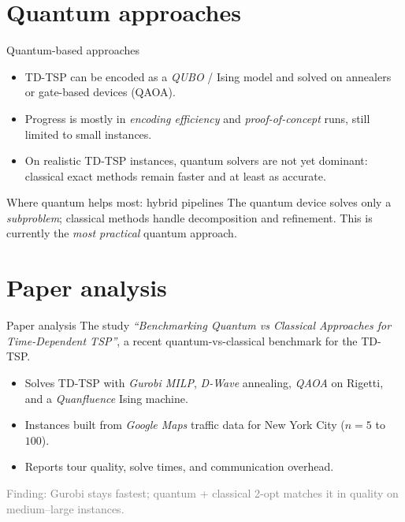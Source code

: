 \documentclass[
11pt,notheorems,hyperref={pdfauthor=Alma Arevalo Loyola}
]{beamer}
\renewcommand{\emphasize}[1]{\textcolor{emphasisblue}{\textit{#1}}}
\newcommand{\emphteal}[1]{\textcolor{emphasisteal}{\textit{#1}}}
\begin{document}
\section{Quantum approaches}

\begin{frame}{Quantum-based approaches}
  \begin{itemize}
    \item TD-TSP can be encoded as a \emphasize{QUBO} / Ising model and solved on annealers or gate-based devices (QAOA).
    \item Progress is mostly in \emphteal{encoding efficiency} and \emphteal{proof-of-concept} runs, still limited to small instances.
    \item On realistic TD-TSP instances, quantum solvers are \alert{not yet dominant}: classical exact methods remain faster and at least as accurate.
  \end{itemize}
  \vspace{0.5em}
  \begin{block}{Where quantum helps most: hybrid pipelines}
    The quantum device solves only a \emphasize{subproblem}; classical methods handle decomposition and refinement. This is currently the \emphasize{most practical} quantum approach.
  \end{block}
\end{frame}

\section{Paper analysis}

\begin{frame}{Paper analysis}
  The study \emph{``Benchmarking Quantum vs Classical Approaches for Time-Dependent TSP''}, a recent quantum-vs-classical benchmark for the TD-TSP.
  \begin{itemize}
    \item Solves TD-TSP with \emphteal{Gurobi MILP}, \emphteal{D-Wave} annealing, \emphteal{QAOA} on Rigetti, and a \emphteal{Quanfluence} Ising machine.
    \item Instances built from \emphasize{Google Maps} traffic data for New York City ($n = 5$ to $100$).
    \item Reports tour quality, solve times, and communication overhead.
  \end{itemize}
  \vspace{0.3em}
  \textcolor{gray}{Finding: Gurobi stays fastest; quantum + classical 2-opt matches it in quality on medium--large instances.}
\end{frame}
\end{document}

